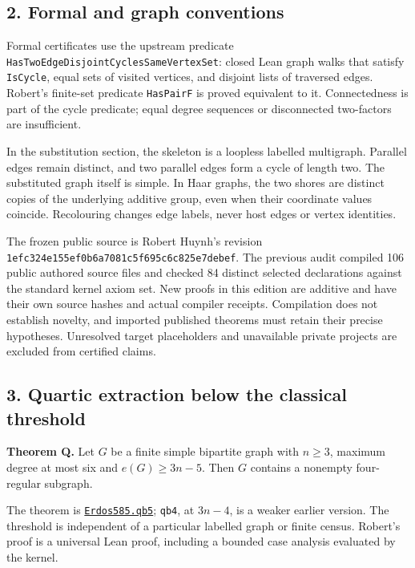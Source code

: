 \documentclass[
  11pt,
]{article}
\newcounter{none} %
\begin{document}
\subsection{2. Formal and graph
conventions}\label{formal-and-graph-conventions}

Formal certificates use the upstream predicate
\texttt{HasTwoEdgeDisjointCyclesSameVertexSet}: closed Lean graph walks
that satisfy \texttt{IsCycle}, equal sets of visited vertices, and
disjoint lists of traversed edges. Robert's finite-set predicate
\texttt{HasPairF} is proved equivalent to it. Connectedness is part of
the cycle predicate; equal degree sequences or disconnected two-factors
are insufficient.

In the substitution section, the skeleton is a loopless labelled
multigraph. Parallel edges remain distinct, and two parallel edges form
a cycle of length two. The substituted graph itself is simple. In Haar
graphs, the two shores are distinct copies of the underlying additive
group, even when their coordinate values coincide. Recolouring changes
edge labels, never host edges or vertex identities.

The frozen public source is Robert Huynh's revision
\texttt{1efc324e155ef0b6a7081c5f695c6c825e7debef}. The previous audit
compiled 106 public authored source files and checked 84 distinct
selected declarations against the standard kernel axiom set. New proofs
in this edition are additive and have their own source hashes and actual
compiler receipts. Compilation does not establish novelty, and imported
published theorems must retain their precise hypotheses. Unresolved
target placeholders and unavailable private projects are excluded from
certified claims.

\subsection{3. Quartic extraction below the classical
threshold}\label{quartic-extraction-below-the-classical-threshold}

\textbf{Theorem Q.} Let \(G\) be a finite simple bipartite graph with
\(n\geq3\), maximum degree at most six and \(e(G)\geq3n-5\). Then \(G\)
contains a nonempty four-regular subgraph.

The theorem is
\href{https://github.com/alejandrozu/openmath-2026-judging/blob/70c5ec3107658182f22c207d4c50f53f9cb3e602/robert-review-2026-10-07/lean/Openmath/Proofs/QB5/Statement.lean\#L42}{\texttt{Erdos585.qb5}};
\texttt{qb4}, at \(3n-4\), is a weaker earlier version. The threshold is
independent of a particular labelled graph or finite census. Robert's
proof is a universal Lean proof, including a bounded case analysis
evaluated by the kernel.
\end{document}
